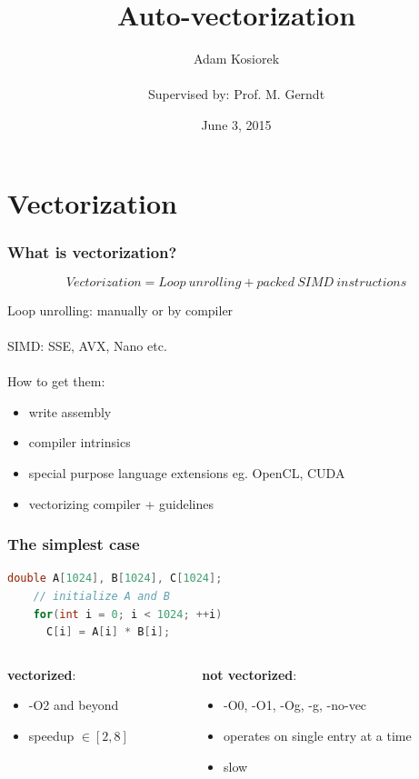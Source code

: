 \documentclass{beamer}
\title{Auto-vectorization}
\author[Adam Kosiorek]{Adam Kosiorek\\ \\{\tiny Supervised by: Prof. M. Gerndt}}
\date {June 3, 2015}
\begin{document}
\frame{\titlepage}


\section{Vectorization}

\begin{frame}[fragile]
  \frametitle{What is vectorization?}

  \begin{equation}
    Vectorization = {Loop\ unrolling} + {packed\ SIMD\ instructions}  
  \end{equation}
  
  Loop unrolling: manually or by compiler \\\ \\
  SIMD: SSE, AVX, Nano etc. \\\ \\
  How to get them:
  \begin{itemize}
   \item write assembly
   \item compiler intrinsics
   \item special purpose language extensions eg. OpenCL, CUDA
   \item vectorizing compiler + guidelines
  \end{itemize}
\end{frame}

\begin{frame}[fragile]
  \frametitle{The simplest case}
  
  \begin{lstlisting}[language=C++]
    double A[1024], B[1024], C[1024];
    // initialize A and B
    for(int i = 0; i < 1024; ++i) 
      C[i] = A[i] * B[i];   
  \end{lstlisting}
  
  \begin{columns}[onlytextwidth]
    \begin{column}{0.4\textwidth}
     \textbf{vectorized}:
     \begin{itemize}
      \item -O2 and beyond
      \item speedup $\in [2, 8]$
     \end{itemize}
    \end{column}
    
    \begin{column}{0.4\textwidth}
     \textbf{not vectorized}:
     \begin{itemize}
      \item -O0, -O1, -Og, -g, -no-vec
      \item operates on single entry at a time
      \item slow
     \end{itemize}
    \end{column}
  \end{columns}
  
\end{frame}
\end{document}
